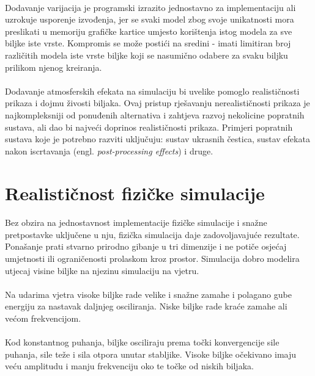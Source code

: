 \documentclass[times, utf8, diplomski]{fer}
\begin{document}
\paragraph{}
Dodavanje varijacija je programski izrazito jednostavno za implementaciju ali
uzrokuje usporenje izvođenja, jer se svaki model zbog svoje unikatnosti mora
preslikati u memoriju grafičke kartice umjesto korištenja istog modela za sve 
biljke iste vrste. Kompromis se može postići na sredini - imati limitiran broj 
različitih modela iste vrste biljke koji se nasumično odabere za svaku biljku 
prilikom njenog kreiranja.
\paragraph{}
Dodavanje atmosferskih efekata na simulaciju bi uvelike pomoglo realističnosti
prikaza i dojmu živosti biljaka. Ovaj pristup rješavanju nerealističnosti 
prikaza je najkompleksniji od ponuđenih alternativa i zahtjeva razvoj nekolicine 
popratnih sustava, ali dao bi najveći doprinos realističnosti prikaza. Primjeri 
popratnih sustava koje je potrebno razviti uključuju: sustav ukrasnih čestica, 
sustav efekata nakon iscrtavanja (engl. \textit{post-processing effects}) i 
druge. 

\section{Realističnost fizičke simulacije} \label{physics_model_eval}
\paragraph{}
Bez obzira na jednostavnost implementacije fizičke simulacije i snažne
pretpostavke uključene u nju, fizička simulacija daje zadovoljavajuće rezultate.
Ponašanje prati stvarno prirodno gibanje u tri dimenzije i ne potiče osjećaj 
umjetnosti ili ograničenosti prolaskom kroz prostor. Simulacija dobro modelira
utjecaj visine biljke na njezinu simulaciju na vjetru. 
\paragraph{}
Na udarima vjetra visoke biljke rade velike i snažne zamahe i polagano gube 
energiju za nastavak daljnjeg osciliranja. Niske biljke rade kraće zamahe ali 
većom frekvencijom.
\paragraph{}
Kod konstantnog puhanja, biljke osciliraju prema točki konvergencije sile 
puhanja, sile teže i sila otpora unutar stabljike. Visoke biljke očekivano imaju veću 
amplitudu i manju frekvenciju oko te točke od niskih biljaka.
\end{document}
